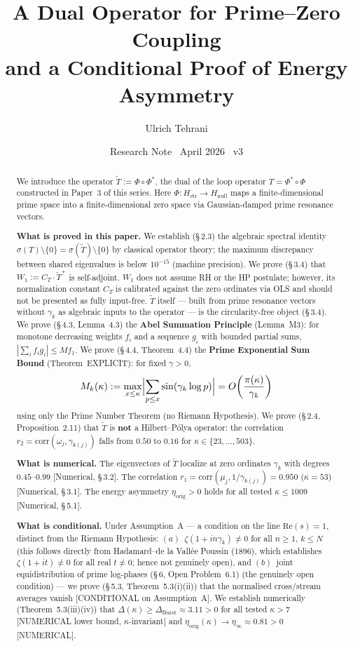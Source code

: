 \documentclass[11pt]{article}
\title{\vspace{-1.5em}\bfseries A Dual Operator for Prime--Zero Coupling\\[0.4em]
\large and a Conditional Proof of Energy Asymmetry}
\author{Ulrich Tehrani}
\date{Research Note \textperiodcentered\ April 2026 \textperiodcentered\ v3}
\newcommand{\Hstr}{H_{\mathrm{str}}}
\newcommand{\Hnull}{H_{\mathrm{null}}}
\newcommand{\etaorig}{\eta_{\mathrm{orig}}}
\newcommand{\Tt}{\widetilde{T}}
\newcommand{\CT}{C_{T}}
\newcommand{\Wone}{W_1}
\newcommand{\Dburstvar}{\Delta_{\mathrm{Burst}}}
\begin{document}
\maketitle

\begin{abstract}
We introduce the operator $\Tt := \Phi \circ \Phi^*$,
the dual of the loop operator $T = \Phi^* \circ \Phi$ constructed in Paper~3
of this series. Here $\Phi\colon\Hstr \to \Hnull$ maps a
finite-dimensional prime space into a finite-dimensional zero space via
Gaussian-damped prime resonance vectors.

\textbf{What is proved in this paper.}
We establish (\S\,2.3) the algebraic spectral identity
$\sigma(T)\setminus\{0\} = \sigma(\Tt)\setminus\{0\}$
by classical operator theory; the maximum discrepancy between shared
eigenvalues is below $10^{-15}$ (machine precision).
We prove (\S\,3.4) that $\Wone := \CT\cdot\Tt^+$ is self-adjoint.
$\Wone$ does not assume RH or the HP postulate; however, its normalization
constant $\CT$ is calibrated against the zero ordinates via OLS and should
not be presented as fully input-free.
$\Tt$ itself --- built from prime resonance vectors without $\gamma_k$ as
algebraic inputs to the operator --- is the circularity-free object (\S\,3.4).
We prove (\S\,4.3, Lemma~4.3) the \textbf{Abel Summation Principle} (Lemma~M3):
for monotone decreasing weights $f_i$ and a sequence $g_i$ with bounded
partial sums, $|\sum_i f_i g_i| \leq M f_1$.
We prove (\S\,4.4, Theorem~4.4) the \textbf{Prime Exponential Sum Bound}
(Theorem~EXPLICIT): for fixed $\gamma > 0$,
\[
M_k(\kappa) := \max_{x \leq \kappa}\Bigl|\sum_{p \leq x}\sin(\gamma_k\log p)\Bigr|
= O\!\left(\frac{\pi(\kappa)}{\gamma_k}\right)
\]
using only the Prime Number Theorem (no Riemann Hypothesis).
We prove (\S\,2.4, Proposition~2.11) that $\Tt$ is \textbf{not} a
Hilbert--P\'olya operator: the correlation
$r_2 = \mathrm{corr}(\omega_j,\gamma_{k(j)})$
falls from $0.50$ to $0.16$ for $\kappa\in\{23,\ldots,503\}$.

\textbf{What is numerical.}
The eigenvectors of $\Tt$ localize at zero ordinates $\gamma_k$
with degrees $0.45$--$0.99$ [Numerical, \S\,3.2].
The correlation $r_1 = \mathrm{corr}(\mu_j,1/\gamma_{k(j)}) = 0.950$
($\kappa=53$) [Numerical, \S\,3.1].
The energy asymmetry $\etaorig > 0$ holds for all tested $\kappa\leq 1009$
[Numerical, \S\,5.1].

\textbf{What is conditional.}
Under Assumption~A --- a condition on the line
$\mathrm{Re}(s)=1$, distinct from the Riemann Hypothesis:
$(a)$~$\zeta(1+in\gamma_k)\neq 0$ for all $n\geq 1$, $k\leq N$
(this follows directly from Hadamard--de la Vall\'ee Poussin (1896),
which establishes $\zeta(1+it)\neq 0$ for all real $t\neq 0$;
hence not genuinely open), and
$(b)$~joint equidistribution of prime log-phases (\S\,6, Open Problem~6.1)
(the genuinely open condition)
--- we prove (\S\,5.3, Theorem~5.3(i)(ii)) that the normalised cross/stream
averages vanish [CONDITIONAL on Assumption~A].
We establish numerically (Theorem~5.3(iii)(iv)) that
$\Delta(\kappa)\geq\Dburstvar\approx 3.11 > 0$ for all tested $\kappa > 7$
[NUMERICAL lower bound, $\kappa$-invariant] and
$\etaorig(\kappa)\to\eta_\infty\approx 0.81 > 0$ [NUMERICAL].


\end{abstract}
\end{document}
